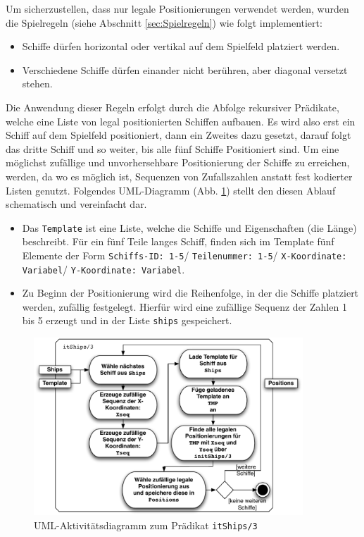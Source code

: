 	Um sicherzustellen, dass nur legale Positionierungen verwendet werden, wurden die Spielregeln (siehe Abschnitt \ref{sec:Spielregeln}) wie folgt implementiert:
	\begin{itemize}
		\item Schiffe dürfen horizontal oder vertikal auf dem Spielfeld platziert werden.\newline
		
		\item Verschiedene Schiffe dürfen einander nicht berühren, aber diagonal versetzt stehen.
		
	\end{itemize}
	Die Anwendung dieser Regeln erfolgt durch die Abfolge rekursiver Prädikate, welche eine Liste von legal positionierten Schiffen aufbauen. Es wird also 
	erst ein Schiff auf dem Spielfeld positioniert, dann ein Zweites dazu gesetzt, darauf folgt das dritte Schiff und so weiter, bis alle fünf Schiffe Positioniert 
	sind. Um eine möglichst zufällige und unvorhersehbare Positionierung der Schiffe zu erreichen, werden, da wo es möglich ist, Sequenzen von Zufallszahlen anstatt 
	fest kodierter Listen genutzt. Folgendes UML-Diagramm (Abb. \ref{fig:itShips}) stellt den diesen Ablauf schematisch und vereinfacht dar.
	\begin{itemize}
		\item Das \texttt{Template} ist eine Liste, welche die Schiffe und Eigenschaften (die Länge) beschreibt. Für ein fünf Teile langes Schiff, finden sich im 
		Template fünf Elemente der Form \texttt{Schiffs-ID: 1-5}/ \texttt{Teilenummer: 1-5}/ \texttt{X-Koordinate: Variabel}/ \texttt{Y-Koordinate: Variabel}.
		\item Zu Beginn der Positionierung wird die Reihenfolge, in der die Schiffe platziert werden, zufällig festgelegt. Hierfür wird eine zufällige Sequenz der 
		Zahlen 1 bis 5 erzeugt und in der Liste \texttt{ships} gespeichert.
	\end{itemize}
	\begin{figure}[H] %
		\centering
		\includegraphics[width=0.9\textwidth]{images/itShips3.pdf}
		\caption{UML-Aktivitätsdiagramm zum Prädikat \texttt{itShips/3}}
		\label{fig:itShips}
	\end{figure}
